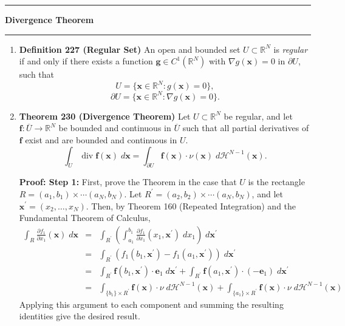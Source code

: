 \documentclass[11pt]{article}
\renewcommand{\div}{\operatorname{div}}
\newcommand{\be}{\mathbf{e}}
\newcommand{\bx}{\mathbf{x}}
\newcommand{\bff}{\mathbf{f}}
\newcommand{\bfg}{\mathbf{g}}
\begin{document}
\hrule
{\Large \bf Divergence Theorem}
\vspace{1mm}
\hrule
\begin{enumerate}
\item \textbf{Definition 227 (Regular Set)}
An open and bounded set $U \subset \mathbb{R}^N$ is \emph{regular} if and only
if there exists a function $\bfg \in C^1(\mathbb{R}^N)$ with
$\nabla g(\bx) = 0$ in $\partial U$, such that
\[U = \{\bx \in \mathbb{R}^N : g(\bx) = 0\},\]
\[\partial U = \{\bx \in \mathbb{R}^N : \nabla g(\bx) = 0\}.\]

\item \textbf{Theorem 230 (Divergence Theorem)}
Let $U \subset \mathbb{R}^N$ be regular, and let
$\bff: \overline{U} \rightarrow \mathbb{R}^N$ be bounded and continuous in
$\overline{U}$ such that all partial derivatives of $\bff$ exist and are
bounded and continuous in $U$.
\[\int_U \div \bff(\bx) \; d\bx
 = \int_{\partial U} \bff(\bx) \cdot \nu(\bx) \; d\mathcal{H}^{N - 1}(\bx).\]

{\bf Proof: Step 1:} First, prove the Theorem in the case that $U$ is the
rectangle $R = (a_1,b_1) \times \cdots (a_N,b_N)$. Let
$R^{\prime} = (a_2,b_2) \times \cdots (a_N,b_N)$, and let
$\bx^{\prime} = (x_2,\ldots,x_N)$. Then, by Theorem 160 (Repeated
Integration) and the Fundamental Theorem of Calculus,
\begin{eqnarray*}
\int_R \frac{\partial f_1}{\partial x_1}(\bx) \; d\bx
 & = & \int_{R^{\prime}}
            \left(
                \int_{a_1}^{b_1} \frac
                    {\partial f_1}
                    {\partial x_1}
                        (x_1,\bx^{\prime})
                \; dx_1
            \right)
        \; d\bx^{\prime} \\
 & = & \int_{R^{\prime}}
            \left(
                f_1(b_1,\bx^{\prime}) - f_1(a_1,\bx^{\prime})
            \right)
        \; d\bx^{\prime} \\
 & = & \int_{R^{\prime}}
                \bff(b_1,\bx^{\prime})\cdot\be_1
        \; d\bx^{\prime}
   +   \int_{R^{\prime}}
                \bff(a_1,\bx^{\prime})\cdot(-\be_1)
        \; d\bx^{\prime} \\
 & = & \int_{\{b_1\} \times R^{\prime}}
                \bff(\bx)\cdot\nu
        \; d\mathcal{H}^{N - 1}(\bx)
   +   \int_{\{a_1\} \times R^{\prime}}
                \bff(\bx)\cdot\nu
        \; d\mathcal{H}^{N - 1}(\bx)
\end{eqnarray*}
Applying this argument to each component and summing the resulting identities
give the desired result.


\end{enumerate}
\end{document}

